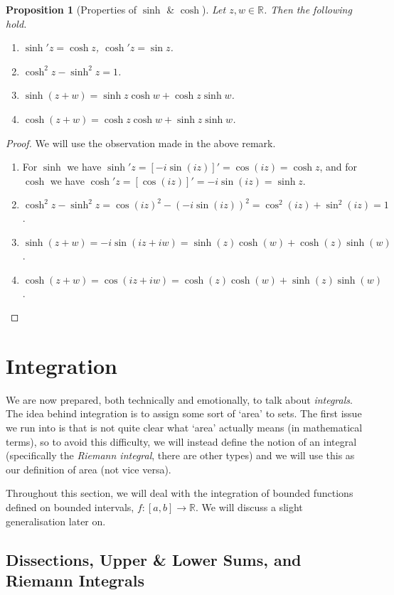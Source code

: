 \documentclass[11pt, a4paper]{article}
\newtheorem{proposition}[theorem]{Proposition}
\theoremstyle{definition}
\newcommand{\R}{\mathbb{R}}
\begin{document}
\begin{proposition}[Properties of $\sinh$ \& $\cosh$]
	Let $z, w \in \R$. Then the following hold.
	\begin{enumerate}[label=(\roman*)]
		\item $\sinh' z = \cosh z$, $\cosh' z = \sin z$.
		\item $\cosh^2 z - \sinh^2 z = 1$.
		\item $\sinh (z+w)=\sinh z \cosh w+\cosh z \sinh w$.
		\item $\cosh (z+w)=\cosh z \cosh w+\sinh z \sinh w$.
	\end{enumerate}
\end{proposition}
\begin{proof}
We will use the observation made in the above remark.
\begin{enumerate}[label=(\roman*)]
	\item For $\sinh$ we have $\sinh'z = [-i\sin(iz)]' = \cos(iz) = \cosh z$, and for $\cosh$ we have $\cosh'z = [\cos(iz)]' = -i\sin(iz) = \sinh z$.
	\item $\cosh^2 z - \sinh^2 z = \cos(iz)^2 - (-i\sin(iz))^2 = \cos^2(iz) + \sin^2(iz) = 1$.
	\item $\sinh(z + w) = -i\sin(iz + iw)= \sinh(z)\cosh(w) + \cosh(z)\sinh(w)$.
	\item $\cosh(z + w) = \cos(iz + iw)= \cosh(z)\cosh(w) + \sinh(z)\sinh(w)$.\qedhere
\end{enumerate}
\end{proof}

\clearpage
\section{Integration}

We are now prepared, both technically and emotionally, to talk about \emph{integrals}. 
The idea behind integration is to assign some sort of `area' to sets. The first issue we run into is that is not quite clear what `area' actually means (in mathematical terms), so to avoid this difficulty, we will instead define the notion of an integral (specifically the \emph{Riemann integral}, there are other types) and we will use this as our definition of area (not vice versa). 

Throughout this section, we will deal with the integration of bounded functions defined on bounded intervals, $f: [a, b] \rightarrow \R$. We will discuss a slight generalisation later on.

\subsection{Dissections, Upper \& Lower Sums, and Riemann Integrals}
\end{document}
